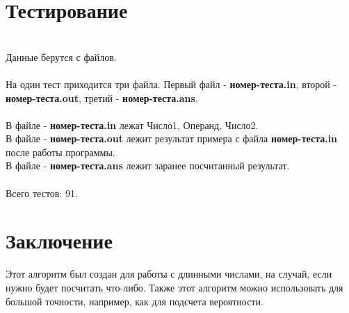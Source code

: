 \documentclass[a4paper]{article}
\begin{document}
\section{Тестирование}
\\Данные берутся с файлов.
\\
\\На один тест приходится три файла. Первый файл - \textbf{номер-теста.in}, второй - \textbf{номер-теста.out}, третий - \textbf{номер-теста.ans}.
\\
\\В файле - \textbf{номер-теста.in} лежат Число1, Операнд, Число2.
\\В файле - \textbf{номер-теста.out} лежит результат примера с файла \textbf{номер-теста.in} после работы программы.
\\В файле - \textbf{номер-теста.ans} лежит заранее посчитанный результат.
\\
\\Всего тестов: 91.
\newpage


\section{Заключение}
Этот алгоритм был создан для работы с длинными числами, на случай, если нужно будет посчитать что-либо. Также этот алгоритм можно использовать для большой точности, например, как для подсчета вероятности.
\newpage


\end{document}
